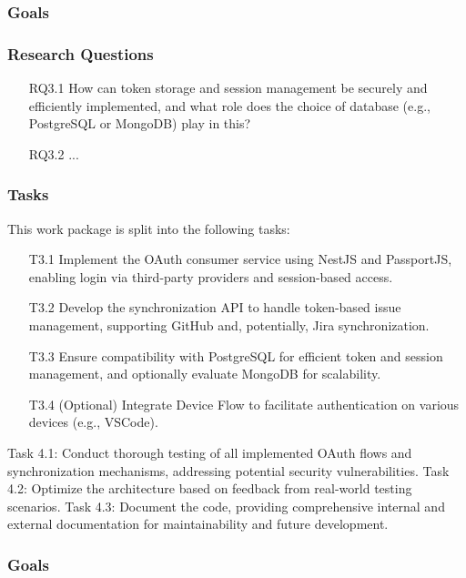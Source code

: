 

\subsubsection{Goals}


\subsubsection{Research Questions}
\begin{itemize}
	\item[RQ3.1]
How can token storage and session management be securely and efficiently implemented, and
what role does the choice of database (e.g., PostgreSQL or MongoDB) play in this?
	\item[RQ3.2] ...
\end{itemize}

\subsubsection{Tasks}
This work package is split into the following tasks:
\begin{itemize}
	\item[T3.1] Implement the OAuth consumer service using NestJS and PassportJS, enabling login via third-party providers and session-based access.
	\item[T3.2] Develop the synchronization API to handle token-based issue management, supporting GitHub and, potentially, Jira synchronization.
	\item[T3.3] Ensure compatibility with PostgreSQL for efficient token and session management, and optionally evaluate MongoDB for scalability.
	\item[T3.4] (Optional) Integrate Device Flow to facilitate authentication on various devices (e.g., VSCode).
\end{itemize}


Task 4.1: Conduct thorough testing of all implemented OAuth flows and synchronization mechanisms, addressing potential security vulnerabilities.
Task 4.2: Optimize the architecture based on feedback from real-world testing scenarios.
Task 4.3: Document the code, providing comprehensive internal and external documentation for maintainability and future development.

\subsubsection{Goals}


